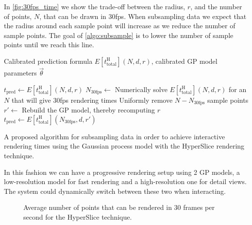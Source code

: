 In \autoref{fig:30fps_time} we show the trade-off between the radius, $r$, and the
number of points, $N$, that can be drawn in 30fps.  When subsampling data we
expect that the radius around each sample point will increase as we reduce
the number of sample points.  The goal of \autoref{algo:subsample} is to 
lower the number of sample points until we reach this line.

\begin{algorithm}
  \begin{algorithmic}
    \Require Calibrated prediction formula $E[t_\text{total}^\text{H}](N, d, r)$,
             calibrated GP model parameters $\vec{\theta}$

    \State $t_\text{pred} \gets E[t_\text{total}^\text{H}](N, d, r)$\;
      \State $N_\text{30fps} \gets$ Numerically solve $E[t_\text{total}^\text{H}](N, d, r)$ for an $N$ that will give 30fps rendering times\;
      \State Uniformly remove $N - N_\text{30fps}$ sample points\;
      \State $r' \gets$ Rebuild the GP model, thereby recomputing $r$\;
      \State $t_\text{pred} \gets E[t_\text{total}^\text{H}](N_\text{30fps}, d, r')$\;
    \EndWhile
  \end{algorithmic}
  \caption{A proposed algorithm for subsampling data in order to achieve
           interactive rendering times using the Gaussian process model
           with the HyperSlice rendering technique.  \label{algo:subsample}}
\end{algorithm}

In this fashion we can have a progressive rendering setup using 2 GP models, 
a low-resolution model for fast rendering and a high-resolution one for
detail views.  The system could dynamically switch between these two when
interacting.

\begin{figure}[h]
  \centering
  
  \caption{
    Average number of points that can be rendered in 30 frames per 
    second for the HyperSlice technique.
  }
  \label{fig:30fps_time}
\end{figure}

